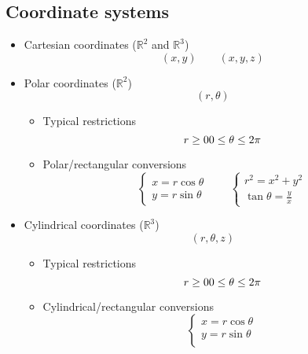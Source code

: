 \subsection{Coordinate systems}
	\begin{itemize}
		\item Cartesian coordinates ($\mathbb{R}^2$ and $\mathbb{R}^3$)
			\begin{equation}
				(x,y) \qquad (x,y,z)
			\end{equation}
		\item Polar coordinates ($\mathbb{R}^2$)
			\begin{equation}
				(r, \theta)
			\end{equation}
			\begin{itemize}
				\item Typical restrictions
					\begin{equation}
						r \geq 0 \\
						0 \leq \theta \leq 2 \pi
					\end{equation}
				\item Polar/rectangular conversions
					\begin{equation}
						\begin{cases}
							x = r \cos \theta \\
							y = r \sin \theta
						\end{cases} \qquad \begin{cases}
							r^2 = x^2 + y^2 \\
							\tan \theta = \frac{y}{x}
						\end{cases}
					\end{equation}
			\end{itemize}
		\item Cylindrical coordinates ($\mathbb{R}^3$)
			\begin{equation}
				(r, \theta, z)
			\end{equation}
			\begin{itemize}
				\item Typical restrictions
					\begin{equation}
						r \geq 0 \\
						0 \leq \theta \leq 2 \pi
					\end{equation}
				\item Cylindrical/rectangular conversions
					\begin{equation}
						\begin{cases}
							x = r \cos \theta \\
							y = r \sin \theta \\

\end{cases}
\end{equation}
\end{itemize}
\end{itemize}
